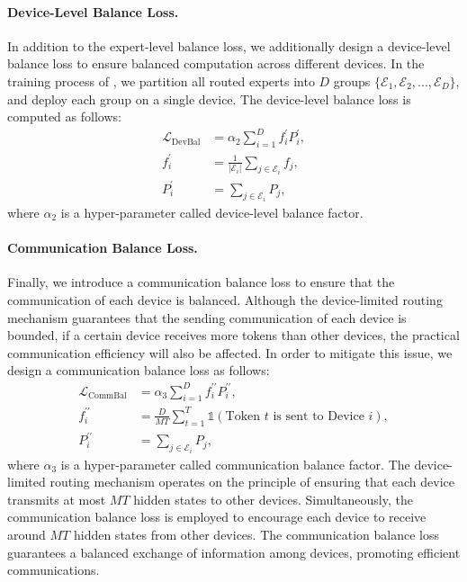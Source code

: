 \paragraph{Device-Level Balance Loss.}
In addition to the expert-level balance loss, we additionally design a device-level balance loss to ensure balanced computation across different devices.
In the training process of \dsvii{}, we partition all routed experts into $D$ groups $\{\mathcal{E}_1, \mathcal{E}_2, ..., \mathcal{E}_D \}$, and deploy each group on a single device. 
The device-level balance loss is computed as follows:
\begin{align}
    \mathcal{L}_{\mathrm{DevBal}} & = \alpha_{2} \sum_{i=1}^{D}{f_i^{\prime} P_i^{\prime}}, \\
    f_i^{\prime} & = \frac{1}{|\mathcal{E}_i|} \sum_{j \in \mathcal{E}_i}{ f_j }, \\
    P_i^{\prime} & = \sum_{j \in \mathcal{E}_i}{ P_j },
\end{align}
where $\alpha_{2}$ is a hyper-parameter called device-level balance factor. 

\paragraph{Communication Balance Loss.}
Finally, we introduce a communication balance loss to ensure that the communication of each device is balanced. 
Although the device-limited routing mechanism guarantees that the sending communication of each device is bounded, if a certain device receives more tokens than other devices, the practical communication efficiency will also be affected. 
In order to mitigate this issue, we design a communication balance loss as follows: 
\begin{align}
    \mathcal{L}_{\mathrm{CommBal}} & = \alpha_{3} \sum_{i=1}^{D}{f_i^{\prime\prime} P_i^{\prime\prime}}, \\
    f_i^{\prime\prime} & = \frac{D}{M T} \sum_{t=1}^{T}{ \mathds{1}( \text{Token $t$ is sent to Device $i$} )}, \\
    P_i^{\prime\prime} & = \sum_{j \in \mathcal{E}_i}{ P_j },
\end{align}
where $\alpha_{3}$ is a hyper-parameter called communication balance factor. 
The device-limited routing mechanism operates on the principle of ensuring that each device transmits at most $MT$ hidden states to other devices. 
Simultaneously, the communication balance loss is employed to encourage each device to receive around $MT$ hidden states from other devices. 
The communication balance loss guarantees a balanced exchange of information among devices, promoting efficient communications. 


